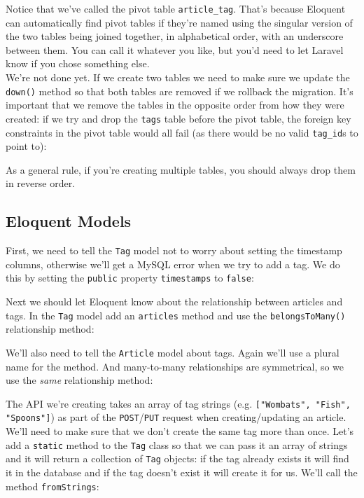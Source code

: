 
Notice that we've called the pivot table \texttt{article\_tag}. That's because Eloquent can automatically find pivot tables if they're named using the singular version of the two tables being joined together, in alphabetical order, with an underscore between them. You can call it whatever you like, but you'd need to let Laravel know if you chose something else.
\\

We're not done yet. If we create two tables we need to make sure we update the \texttt{down()} method so that both tables are removed if we rollback the migration. It's important that we remove the tables in the opposite order from how they were created: if we try and drop the \texttt{tags} table before the pivot table, the foreign key constraints in the pivot table would all fail (as there would be no valid \texttt{tag\_id}s to point to):


As a general rule, if you're creating multiple tables, you should always drop them in reverse order.


\subsection{Eloquent Models}

First, we need to tell the \texttt{Tag} model not to worry about setting the timestamp columns, otherwise we'll get a MySQL error when we try to add a tag. We do this by setting the \texttt{public} property \texttt{timestamps} to \texttt{false}:


Next we should let Eloquent know about the relationship between articles and tags. In the \texttt{Tag} model add an \texttt{articles} method and use the \texttt{belongsToMany()} relationship method:


We'll also need to tell the \texttt{Article} model about tags. Again we'll use a plural name for the method. And many-to-many relationships are symmetrical, so we use the \textit{same} relationship method:


The API we're creating takes an array of tag strings (e.g. \texttt{["Wombats", "Fish", "Spoons"]}) as part of the \texttt{POST}/\texttt{PUT} request when creating/updating an article. We'll need to make sure that we don't create the same tag more than once. Let's add a \texttt{static} method to the \texttt{Tag} class so that we can pass it an array of strings and it will return a collection of \texttt{Tag} objects: if the tag already exists it will find it in the database and if the tag doesn't exist it will create it for us. We'll call the method \texttt{fromStrings}:

